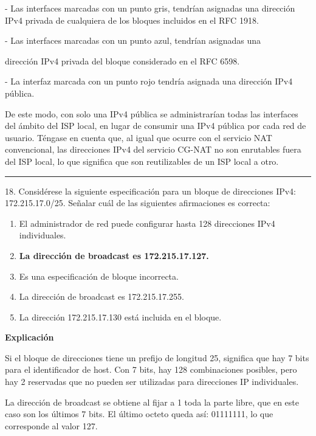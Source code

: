\documentclass[10pt,a4paper]{article}
\begin{document}
- Las interfaces marcadas con un punto gris, tendrían asignadas una dirección IPv4 privada de cualquiera de los bloques incluidos en el RFC 1918.

- Las interfaces marcadas con un punto azul, tendrían asignadas una 

 dirección IPv4 privada del bloque considerado en el RFC 6598.

- La interfaz marcada con un punto rojo tendría asignada una dirección IPv4 pública.

De este modo, con solo una IPv4 pública se administrarían todas las interfaces del ámbito del ISP local, en lugar de consumir una IPv4 pública por cada red de usuario. Téngase en cuenta que, al igual que ocurre con el servicio NAT convencional, las direcciones IPv4 del servicio CG-NAT no son enrutables fuera del ISP local, lo que significa que son reutilizables de un ISP local a otro.

\vspace{15pt} \hrule \vspace{15pt}




18.  Considérese la siguiente especificación para un bloque de direcciones IPv4: 172.215.17.0/25. Señalar cuál de las siguientes afirmaciones es correcta:


\begin{enumerate}[label=\alph*]
    \item El administrador de red puede configurar hasta 128 direcciones IPv4 individuales.
    \item \textbf{La dirección de broadcast es 172.215.17.127.}
    \item Es una especificación de bloque incorrecta.
    \item La dirección de broadcast es 172.215.17.255.
    \item La dirección 172.215.17.130 está incluida en el bloque.
\end{enumerate}

\textbf{Explicación}

Si el bloque de direcciones tiene un prefijo de longitud 25, significa que hay 7 bits para el identificador de host. Con 7 bits, hay 128 combinaciones posibles, pero hay 2 reservadas que no pueden ser utilizadas para direcciones IP individuales.

La dirección de broadcast se obtiene al fijar a 1 toda la parte libre, que en este caso son los últimos 7 bits. El último octeto queda así: 01111111, lo que corresponde al valor 127.
\end{document}
